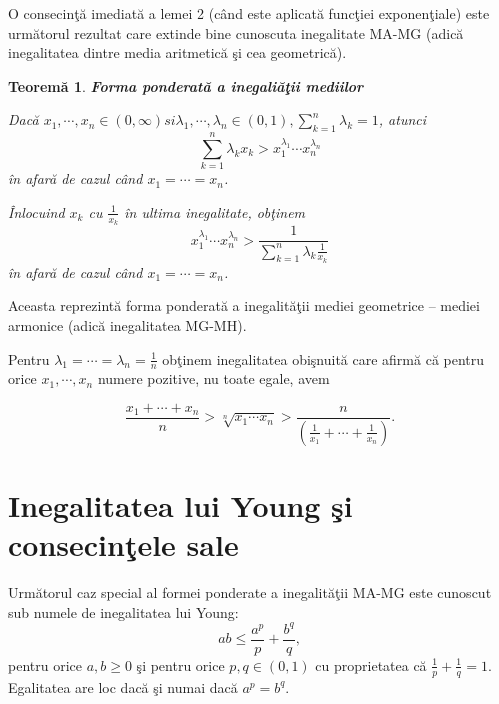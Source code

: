 \documentclass[a4paper,12pt,oneside]{report}
\newtheorem{theorem}{Teorem\u a}
\begin{document}
O consecin\c{t}\u{a} imediat\u{a} a lemei 2 (c\^{a}nd este aplicat\u{a} func\c{t}iei exponen\c{t}iale) este urm\u{a}torul rezultat care extinde bine cunoscuta inegalitate MA-MG (adic\u{a} inegalitatea dintre media aritmetic\u{a} \c{s}i cea geometric\u{a}).


\begin{theorem}
\textbf{Forma ponderat\u{a} a inegali\u{a}\c{t}ii mediilor}

Dac\u{a} \(x_{1},\cdots,x_{n}\in \left ( 0,\infty  \right ) si \lambda_{1},\cdots,\lambda _{n} \in \left ( 0 , 1 \right ), \sum_{k = 1}^{n}\lambda _{k}= 1\), atunci
\begin{displaymath}
  \sum_{k = 1}^{n}\lambda _{k}x_{k}> x_{1}^{\lambda _{1}}\cdots x_{n}^{\lambda _{n}}
\end{displaymath}
\^{i}n afar\u{a} de cazul c\^{a}nd \(x_{1} = \cdots = x_{n}\).

  \^{I}nlocuind \(x_{k}\) cu \(\frac{1}{x_{k} }\) \^{i}n ultima inegalitate, ob\c{t}inem
\begin{displaymath}
  x_{1}^{\lambda _{1}}\cdots x_{n}^{\lambda _{n}}> \frac{1}{\sum_{k = 1}^{n}\lambda _{k}\frac{1}{x_{k}}}
\end{displaymath}
\^{i}n afar\u{a} de cazul c\^{a}nd \(x_{1} = \cdots = x_{n}\).
\end{theorem}
Aceasta reprezint\u{a} forma ponderat\u{a} a inegalit\u{a}\c{t}ii mediei geometrice – mediei armonice (adic\u{a} inegalitatea MG-MH).

Pentru \(\lambda _{1} = \cdots =\lambda _{n}= \frac{1}{n}\) ob\c{t}inem inegalitatea obi\c{s}nuit\u{a} care afirm\u{a} c\u{a} pentru orice \(x_{1},\cdots,x_{n}\)  numere pozitive, nu toate egale, avem

\begin{displaymath}
  \frac{x_{1}+\cdots+x_{n}}{n}> \sqrt[n]{x_{1}\cdots x_{n}}> \frac{n}{\left ( \frac{1}{x_{1}}+\cdots+\frac{1}{x_{n}} \right )}.
\end{displaymath}




\section{Inegalitatea lui Young \c{s}i consecin\c{t}ele sale}

Urm\u{a}torul caz special al formei ponderate a inegalit\u{a}\c{t}ii MA-MG este cunoscut sub numele de inegalitatea lui Young:
\begin{displaymath}
  ab \leq \frac{a^{p}}{p}+ \frac{b^{q}}{q}, \label{eq: 1.4} \tag{1.4}
\end{displaymath}
pentru orice \(a,b \geq 0\)
\c{s}i pentru orice  \(p,q \in \left ( 0 , 1 \right )\) cu proprietatea c\u{a} \(\frac{1}{p}+\frac{1}{q} = 1\).
Egalitatea are loc dac\u{a} \c{s}i numai dac\u{a} \(a^{p}= b^{q}\).
\end{document}
